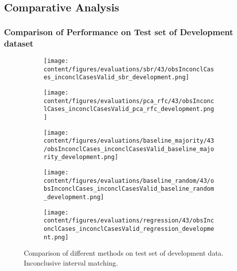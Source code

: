 \subsection{Comparative Analysis}
\label{subsec:compar_anal}


\subsubsection{Comparison of Performance on Test set of Development dataset}
\label{subsubsec:perf_comp_dev}


\begin{figure}[t]
  \begin{subfigure}{0.5\textwidth}
    \centering
    \texttt{[image: content/figures/evaluations/sbr/43/obsInconclCases\_inconclCasesValid\_sbr\_development.png]}
  \end{subfigure}
  \hfill
  \begin{subfigure}{0.5\textwidth}
    \centering
    \texttt{[image: content/figures/evaluations/pca\_rfc/43/obsInconclCases\_inconclCasesValid\_pca\_rfc\_development.png]}
  \end{subfigure}
  \hfill
  \begin{subfigure}{0.5\textwidth}
    \centering
    \texttt{[image: content/figures/evaluations/baseline\_majority/43/obsInconclCases\_inconclCasesValid\_baseline\_majority\_development.png]}
  \end{subfigure}
  \hfill
  \begin{subfigure}{0.5\textwidth}
    \centering
    \texttt{[image: content/figures/evaluations/baseline\_random/43/obsInconclCases\_inconclCasesValid\_baseline\_random\_development.png]}
  \end{subfigure}
  \hfill
  \begin{subfigure}{0.5\textwidth}
    \centering
    \texttt{[image: content/figures/evaluations/regression/43/obsInconclCases\_inconclCasesValid\_regression\_development.png]}
  \end{subfigure}

  \caption{Comparison of different methods on test set of development data. Inconclusive interval matching.}
  \label{fig:test_interval_match_dev}
\end{figure}

